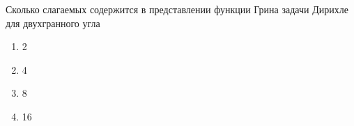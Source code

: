 Сколько слагаемых содержится в представлении функции Грина задачи Дирихле для двухгранного угла

\begin{enumerate}[label=\arabic*)]
    \item 2
    \item 4
    \item 8
    \item 16
\end{enumerate}


